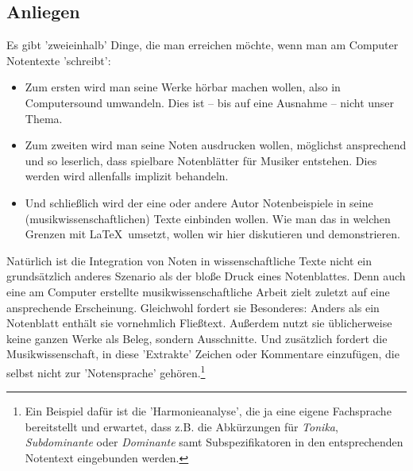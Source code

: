 %
%
%



\subsection{Anliegen}

Es gibt 'zweieinhalb' Dinge, die man erreichen möchte, wenn man am Computer
Notentexte 'schreibt':

\begin{itemize}
  \item Zum ersten wird man seine Werke hörbar machen wollen, also in
  Computersound umwandeln. Dies ist -- bis auf eine Ausnahme -- nicht
  unser Thema.
  \item Zum zweiten wird man seine Noten ausdrucken wollen, möglichst
  ansprechend und so leserlich, dass spielbare Notenblätter für Musiker
  entstehen. Dies werden wird allenfalls implizit behandeln.
  \item Und schließlich wird der eine oder andere Autor Notenbeispiele in seine
  (musikwissenschaftlichen) Texte einbinden wollen. Wie man das in welchen
  Grenzen mit \LaTeX\ umsetzt, wollen wir hier diskutieren und demonstrieren.
\end{itemize}

Natürlich ist die Integration von Noten in wissenschaftliche Texte nicht ein
grundsätzlich anderes Szenario als der bloße Druck eines Notenblattes.
Denn auch eine am Computer erstellte musikwissenschaftliche Arbeit zielt zuletzt
auf eine ansprechende Erscheinung. Gleichwohl fordert sie Besonderes: Anders als
ein Notenblatt enthält sie vornehmlich Fließtext. Außerdem nutzt sie
üblicherweise keine ganzen Werke als Beleg, sondern Ausschnitte. Und zusätzlich
fordert die Musikwissenschaft, in diese 'Extrakte' Zeichen oder Kommentare
einzufügen, die selbst nicht zur 'Notensprache' gehören.\footnote{Ein Beispiel
dafür ist die 'Harmonieanalyse', die ja eine eigene Fachsprache bereitstellt und
erwartet, dass z.B. die Abkürzungen für \textit{Tonika}, \textit{Subdominante}
oder \textit{Dominante} samt Subspezifikatoren in den entsprechenden Notentext
eingebunden werden.}

